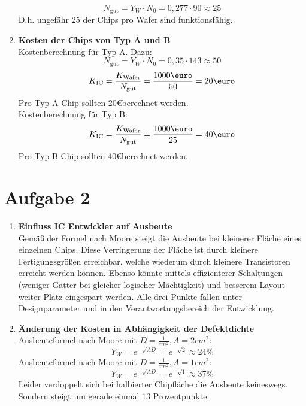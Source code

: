\documentclass[a4paper,10pt,headsepline, DIV11]{scrartcl}%
\begin{document}
\begin{enumerate}
		\[N_{\text{gut}}=Y_W\cdot N_0 =  0,277\cdot 90\approx 25\]
		D.h. ungefähr 25 der Chips pro Wafer sind funktionsfähig.
		\item \textbf{Kosten der Chips von Typ A und B}\hfill \\
		Kostenberechnung für Typ A. Dazu:
			\[N_{\text{gut}}=Y_W\cdot N_0 =  0,35 \cdot 143 \approx 50\]
		\[ K_{\text{IC}} = \frac{K_{\text{Wafer}}}{N_{\text{gut}}} = \frac{1000\text{\euro}}{50}=20\text{\euro}\]
		Pro Typ A Chip sollten 20\euro berechnet werden.\\
		Kostenberechnung für Typ B:
		\[ K_{\text{IC}} = \frac{K_{\text{Wafer}}}{N_{\text{gut}}} = \frac{1000\text{\euro}}{25}=40\text{\euro}\]
		Pro Typ B Chip sollten 40\euro berechnet werden.
	\end{enumerate}
\section*{Aufgabe 2}
\begin{enumerate}
	\item \textbf{Einfluss IC Entwickler auf Ausbeute}\hfill \\
	Gemäß der Formel nach Moore steigt die Ausbeute bei kleinerer Fläche eines einzelnen Chips. Diese Verringerung der Fläche ist durch kleinere Fertigungsgrößen erreichbar, welche wiederum durch kleinere Transistoren erreicht werden können. Ebenso könnte mittels effizienterer Schaltungen (weniger Gatter bei gleicher logischer Mächtigkeit) und besserem Layout weiter Platz eingespart werden. Alle drei Punkte fallen unter Designparameter und in den Verantwortungsbereich der Entwicklung.
	\item  \textbf{Änderung der Kosten in Abhängigkeit der Defektdichte}\hfill \\
	Ausbeuteformel nach Moore mit $D= \frac{1}{cm^2}, A=2cm^2$:
	\[ Y_{W} = e^{-\sqrt{AD}} = e^{-\sqrt{2}} \approx 24\% \]
	Ausbeuteformel nach Moore mit $D= \frac{1}{cm^2}, A=1cm^2$:
	\[ Y_{W} = e^{-\sqrt{AD}} = e^{-\sqrt{1}} \approx 37\% \]
	Leider verdoppelt sich bei halbierter Chipfläche die Ausbeute keineswegs. Sondern steigt um gerade einmal 13 Prozentpunkte.
\end{enumerate}
	
\end{document}
